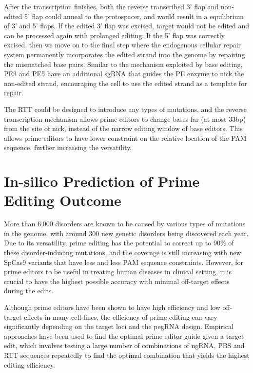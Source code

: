 After the transcription finishes, both the reverse transcribed 3' flap and non-edited 5' flap could anneal to the protospacer, and would result in a equilibrium of 3' and 5' flaps. If the edited 3' flap was excised, target would not be edited and can be processed again with prolonged editing. If the 5' flap was correctly excised, then we move on to the final step where the endogenous cellular repair system permanently incorporates the edited strand into the genome by repairing the mismatched base pairs. Similar to the mechanism exploited by base editing, PE3 and PE5 have an additional sgRNA that guides the PE enzyme to nick the non-edited strand, encouraging the cell to use the edited strand as a template for repair\cite{liudavidr.SearchandreplaceGenomeEditing2019}.

The RTT could be designed to introduce any types of mutations, and the reverse transcription mechanism allows prime editors to change bases far (at most 33bp) from the site of nick, instead of the narrow editing window of base editors. This allows prime editors to have lower constraint on the relative location of the PAM sequence, further increasing the versatility\cite{liuPrimeEditingPrecise2023}.

\section{In-silico Prediction of Prime Editing Outcome}

\label{sec:motivation}

More than 6,000 disorders are known to be caused by various types of mutations in the genome, with around 300 new genetic disorders being discovered each year\cite{petraityteGenomeEditingMedicine2021}. Due to its versatility, prime editing has the potential to correct up to 90\% of these disorder-inducing mutations\cite{kantorCRISPRCas9DNABaseEditing2020}, and the coverage is still increasing with new SpCas9 variants that have less and less PAM sequence constraints\cite{waltonUnconstrainedGenomeTargeting2020}. However, for prime editors to be useful in treating human diseases in clinical setting, it is crucial to have the highest possible accuracy with minimal off-target effects during the edits. 

Although prime editors have been shown to have high efficiency and low off-target effects in many cell lines, the efficiency of prime editing can vary significantly depending on the target loci and the pegRNA design\cite{liudavidr.SearchandreplaceGenomeEditing2019}. Empirical approaches have been used to find the optimal prime editor guide given a target edit, which involves testing a large number of combinations of ngRNA, PBS and RTT sequences repeatedly to find the optimal combination that yields the highest editing efficiency.

